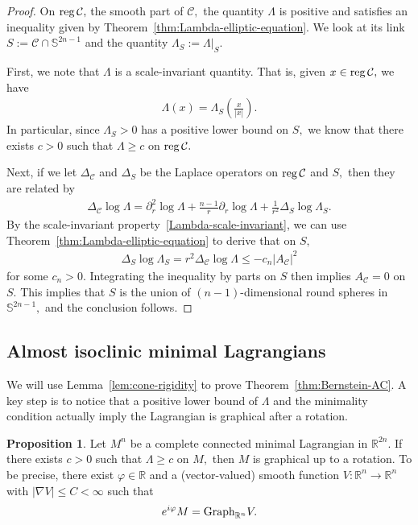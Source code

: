 \documentclass[11pt]{amsart}
\numberwithin{equation}{section}
\theoremstyle{definition}
\theoremstyle{definition}
\newtheorem{prop}[equation]{Proposition} %
\newcommand{\pr}[1]{\left(#1\right)}
\newcommand{\bb}[1]{\mathbb{#1}} \newcommand{\td}[1]{\widetilde{#1}}
\newcommand{\D}{\Delta}
\newcommand{\n}{\nabla}
\newcommand{\bd}{\partial}
\begin{document}
\begin{proof}
	On ${\rm reg}\,\mathcal C,$ the smooth part of $\mathcal C,$ the quantity $\Lambda$ is positive and satisfies an inequality given by Theorem~\ref{thm:Lambda-elliptic-equation}.
	We look at its link $S:=\mathcal C\cap \mathbb S^{2n-1}$ and the quantity $\Lambda_S:=\Lambda|_S.$
	
	First, we note that $\Lambda$ is a scale-invariant quantity.
	That is, given $x\in {\rm reg}\,\mathcal C,$ we have
	\begin{align}\label{Lambda-scale-invariant}
	\Lambda(x) = \Lambda_S\pr{\frac{x}{|x|}}.
	\end{align}
	In particular, since $\Lambda_S>0$ has a positive lower bound on $S,$ we know that there exists $c>0$ such that $\Lambda\ge c$ on ${\rm reg}\,\mathcal C.$
	
	Next, if we let $\D_{\mathcal C}$ and $\D_S$ be the Laplace operators on ${\rm reg}\,\mathcal C$ and $S,$ then they are related by
	\begin{align*}
	\D_{\mathcal C} \log \Lambda
	= \bd_r^2 \log \Lambda
	+ \frac{n-1}r \bd_r \log \Lambda
	+ \frac 1{r^2}\D_S \log \Lambda_S.
	\end{align*}
	By the scale-invariant property~\eqref{Lambda-scale-invariant}, we can use Theorem~\ref{thm:Lambda-elliptic-equation} to derive that on $S,$
	\begin{align*}
	\D_S\log \Lambda_S
	= r^2 \D_{\mathcal C}\log \Lambda
	\le -c_n|A_{\mathcal C}|^2
	\end{align*}
	for some $c_n>0.$
	Integrating the inequality by parts on $S$ then implies $A_{\mathcal C}=0$ on $S.$
	This implies that $S$ is the union of $(n-1)$-dimensional round spheres in $\mathbb S^{2n-1},$ and the conclusion follows.	
\end{proof}


\subsection{Almost isoclinic minimal Lagrangians}

We will use Lemma~\ref{lem:cone-rigidity} to prove Theorem~\ref{thm:Bernstein-AC}.
A key step is to notice that a positive lower bound of $\Lambda$ and the minimality condition actually imply the Lagrangian is graphical after a rotation.


\begin{prop}
\label{prop:graphicality-of-AI-minimal}
    Let $M^n$ be a complete connected minimal Lagrangian in $\bb R^{2n}.$
	If there exists $c>0$ such that $\Lambda\ge c$ on $M,$ then $M$ is graphical up to a rotation.
    To be precise, there exist $\varphi\in\bb R$ and a (vector-valued) smooth function $V\colon \bb R^n\to \bb R^n$ with $|\n V|\le C<\infty$ such that
	\begin{align*}
	e^{i\varphi} M = {\rm Graph}_{\bb R^n} V.
	\end{align*}
\end{prop}
\end{document}
